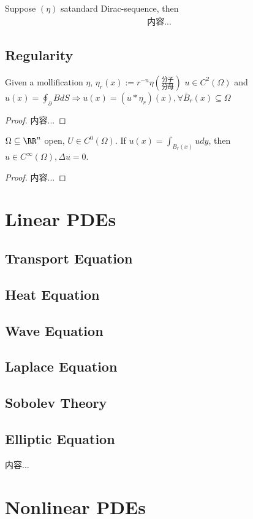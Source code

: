 \documentclass[Total.tex]{subfiles}
\begin{document}
			\begin{lemma}
				Suppose $(\eta)$ satandard Dirac-sequence, then
				\begin{gather*}
					内容...
				\end{gather*}
			\end{lemma}
		\section{Regularity}
			\begin{lemma}
				Given a mollification $\eta$, $\eta_r(x):=r^{-n}\eta(\frac{分子}{分母})$ $u\in C^2(\Omega)$ and $u(x)=\oint_\partial BdS\Rightarrow u(x)=(u*\eta_r)(x),\forall \bar{B}_r(x)\subseteq \Omega$
			\end{lemma}
			\begin{proof}
				内容...
			\end{proof}
			\begin{proposition}
				$\Omega\subseteq \RR^n$ open, $U\in C^0(\Omega)$. If $u(x)=\int_{B_r(x)} udy$, then $u\in C^\infty(\Omega),\Delta u=0$.			
			\end{proposition}
			\begin{proof}
				内容...
			\end{proof}
			
	\chapter{Linear PDEs}
		\section{Transport Equation}
		\section{Heat Equation}
		\section{Wave Equation}
		\section{Laplace Equation}
		\section{Sobolev Theory}
		\section{Elliptic Equation}
			\begin{Def}
				内容...
			\end{Def}
	\chapter{Nonlinear PDEs}
\end{document}
